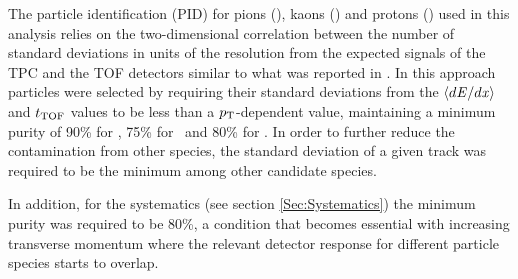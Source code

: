 
The particle identification (PID) for pions (\pion), kaons (\kaon) and protons (\proton) used in this analysis relies on the two-dimensional correlation between the number of standard deviations in units of the resolution from the expected signals of the TPC and the TOF detectors similar to what was reported in \cite{Abelev:2014pua,Adam:2016nfo,Acharya:2018zuq}. In this approach particles were selected by requiring their standard deviations from the $\langle d{\it E}/d{\it x}\rangle$ and $t_{\rm TOF}$ values to be less than a $p_{\rm T}$-dependent value, maintaining a minimum purity of 90\% for \pion, 75\% for \kaon~and 80\% for \proton. In order to further reduce the contamination from other species, the standard deviation of a given track was required to be the minimum among other candidate species. 



In addition, for the systematics (see section \ref{Sec:Systematics}) the minimum purity was required to be 80\%, a condition that becomes essential with increasing transverse momentum where the relevant detector response for different particle species starts to overlap.

